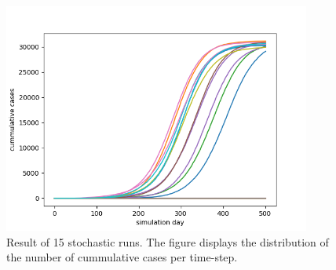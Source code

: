 \documentclass[runningheads]{llncs}
\begin{document}
	\begin{figure}
		\centering
		\includegraphics[width=0.90\textwidth]{stochastic_analysis.png}
		\caption{Result of 15 stochastic runs. The figure displays the distribution of the number of cummulative cases per time-step.} 	
		\label{stochastic_analysis.png}
	\end{figure} 
	
	
\end{document}
